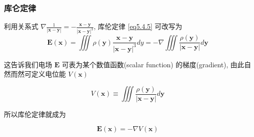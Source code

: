 \documentclass[aspectratio=2516]{beamer}
\begin{document}
\begin{frame}
\frametitle{\kaishu 库仑定律}

\kaishu

\small 

 利用关系式 $\nabla \frac{1}{{\left| {\boldsymbol{x} - \boldsymbol{y}} \right|}} =  - \frac{{\boldsymbol{x} - \boldsymbol{y}}}{{{{\left| {\boldsymbol{x} - \boldsymbol{y}} \right|}^3}}}$, 库伦定律 \ref{eq5.4.5} 可改写为
\begin{equation}
\boldsymbol{E}\left( \boldsymbol{x} \right) = \iiint {\rho \left( \boldsymbol{y} \right)\frac{{\boldsymbol{x} - \boldsymbol{y}}}{{{{\left| {\boldsymbol{x} - \boldsymbol{y}} \right|}^3}}}dy} =  - \nabla \iiint {\frac{{\rho \left( \boldsymbol{y} \right)}}{{\left| {\boldsymbol{x} - \boldsymbol{y}} \right|}}d\boldsymbol{y}}
\label{eq5.4.6}
\end{equation}

这告诉我们电场 $ \boldsymbol{E} $ 可表为某个数值函数(scalar function) 的梯度(gradient), 由此自然而然可定义电位能 $ V(\boldsymbol{x}) $

\begin{equation}
V\left( \boldsymbol{x} \right) \equiv \iiint {\frac{{\rho \left( \boldsymbol{y} \right)}}{{\left| {\boldsymbol{x} - \boldsymbol{y}} \right|}}d\boldsymbol{y}}
\label{eq5.4.7}
\end{equation}

所以库伦定律就成为

\begin{equation}
\boldsymbol{E}\left( \boldsymbol{x} \right) =  - \nabla V\left( \boldsymbol{x} \right)
\label{eq5.4.8}
\end{equation}

\end{frame}


\end{document}

